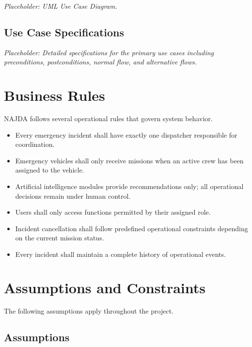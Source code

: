 \textit{Placeholder: UML Use Case Diagram.}

\subsection{Use Case Specifications}

\textit{Placeholder: Detailed specifications for the primary use cases including preconditions, postconditions, normal flow, and alternative flows.}


\section{Business Rules}

NAJDA follows several operational rules that govern system behavior.

\begin{itemize}
    \item Every emergency incident shall have exactly one dispatcher responsible for coordination.
    \item Emergency vehicles shall only receive missions when an active crew has been assigned to the vehicle.
    \item Artificial intelligence modules provide recommendations only; all operational decisions remain under human control.
    \item Users shall only access functions permitted by their assigned role.
    \item Incident cancellation shall follow predefined operational constraints depending on the current mission status.
    \item Every incident shall maintain a complete history of operational events.
\end{itemize}


\section{Assumptions and Constraints}

The following assumptions apply throughout the project.

\subsection{Assumptions}

